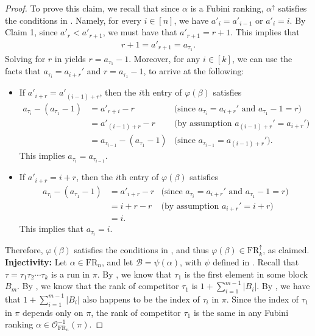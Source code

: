 \documentclass{amsart}
\theoremstyle{definition}
\theoremstyle{definition}
\theoremstyle{remark}
\newcommand{\FR}[1]{\mathrm{FR}_{#1}}
\newcommand{\out}{\mathcal{O}}
\begin{document}
\begin{proof}
To prove this claim, we recall that since $\alpha$ is a Fubini ranking, $\alpha^{\uparrow}$ satisfies the conditions in . Namely, for every $i \in [n]$, we have $a'_i = a'_{i-1}$ or $a'_i = i$. 
    By Claim 1, since  $a'_{r} < a'_{r+1}$, we must have that $a'_{r+1} = r+1$. 
    This implies that
    \begin{align}\label{eq:solve for r}r+1 = a'_{r+1} = a_{\tau_1}. \end{align}
    Solving for $r$ in  yields $r = a_{\tau_1}-1$. 
    Moreover, for any $i \in [k]$, we can use the facts that $a_{\tau_i}=a_{i+r}'$ and $r=a_{\tau_1}-1$, to arrive at the following:
    \begin{itemize}
        \item If $a'_{i+r}=a'_{(i-1)+r}$, then  the $i$th entry of $\varphi(\beta)$ satisfies
        \begin{align*}
            a_{\tau_i}-(a_{\tau_1}-1) &= a'_{r+i}-r &\mbox{(since $a_{\tau_i}=a_{i+r}'$ and $a_{\tau_1}-1=r$)}\\
            &= a'_{(i-1)+r}-r &\mbox{(by assumption $a_{(i-1)+r}'=a_{i+r}'$)}\\
            &= a_{\tau_{i-1}}-(a_{\tau_1}-1) &\mbox{(since $a_{\tau_{i-1}}=a_{(i-1)+r}'$)}.
        \end{align*}
         This implies $a_{\tau_i}=a_{\tau_{i-1}}$.
        
        \item If $a'_{i+r}=i+r$, then the $i$th entry of $\varphi(\beta)$ satisfies
        \begin{align*}
        a_{\tau_i} -(a_{\tau_1}-1)&= a'_{i+r}-r &\mbox{(since $a_{\tau_i}=a_{i+r}'$ and $a_{\tau_1}-1=r$)}\\
        &= i+r-r &\mbox{(by assumption $a_{i+r}'=i+r$)}\\
        &= i    .
        \end{align*}
        This implies that $a_{\tau_i}=i$.
    \end{itemize}
Therefore, $\varphi(\beta)$ satisfies the conditions in , and thus $\varphi(\beta)\in\FR{k}^\uparrow$, as claimed.
\\

\noindent\textbf{Injectivity:} Let $\alpha \in \FR{n}$, and let $\mathcal{B} = \psi(\alpha)$, with $\psi$ defined in . Recall that $\tau = \tau_1 \tau_2\cdots \tau_k$ is a run in $\pi$. 
    By , we know that $\tau_1$ is the first element in some block $B_m$. By , we know that the rank of competitor $\tau_1$ is $1 + \sum_{i=1}^{m-1} |B_i|$. By , we have that $1 + \sum_{i=1}^{m-1} |B_i|$ also happens to be the index of $\tau_i$ in $\pi$. 
    Since the index of $\tau_1$ in $\pi$ depends only on $\pi$, the rank of competitor $\tau_1$ is the same in any Fubini ranking $\alpha \in \out^{-1}_{\FR{n}}(\pi)$.  


\end{proof}
\end{document}
